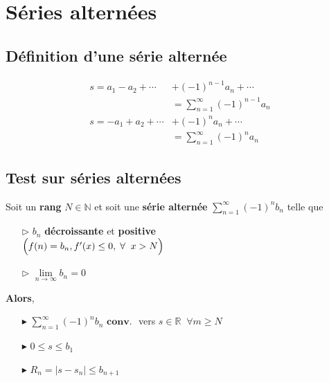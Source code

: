 \documentclass{report}
\begin{document}
\begin{multicols*}{3}
\begin{center}
\begin{tikzpicture}[xscale=0.7, yscale=0.4]
    \end{tikzpicture}
    \end{center}


     \chapter{Séries alternées}

     \section{Définition d'une série alternée}
     \vspace{-2em}
     \begin{align*}
         s=a_1-a_2+\cdots&+(-1)^{n-1}a_n +\cdots 
         \\
         &=\sum_{n=1}^\infty(-1)^{n-1}a_n
         \\
         s=-a_1+a_2 +\cdots&+(-1)^na_n+\cdots 
         \\
         &=\sum_{n=1}^\infty(-1)^na_n                
     \end{align*}               




     \section{Test sur séries alternées}
     Soit un \textbf{rang} $N \in \mathbb{N}$ et 
     soit une \textbf{série alternée} 
     $\sum_{n=1}^{\infty } (-1)^nb_n$ telle que 
     \begin{itemize}
       \item [$\rhd$ ]  $b_n$ \textbf{décroissante}  et \textbf{positive} \\
           $\Bigl(f(n) = b_n, f^{\prime}(x) \leq 0, \; \forall \;\; x > N\Bigr)$
       \item [$\rhd$ ] $\lim\limits_{n\to\infty }b_n = 0$ 
     \end{itemize}
     \textbf{Alors}, 
     \begin{itemize}
        \item[$\blacktriangleright$]
        $\sum_{n=1}^{\infty }  (-1)^nb_n \textbf{ conv. }$ vers $s \in
    \mathbb{R} \;\; \forall m \geq N $ 
        \item[$\blacktriangleright$]
    $0 \leq s \leq b_1$ 
        \item[$\blacktriangleright$] 
    $R_n = |s - s_n | \leq b_{n+1}$
     \end{itemize}
\vspace{-4em}

\end{multicols*}
\end{document}

